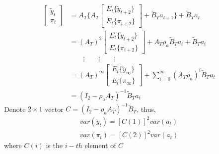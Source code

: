 \documentclass[12pt]{article}
\begin{document}
\begin{equation}
\begin{aligned}
\left[
\begin{array}{c}
 \tilde{y}_{t}\\
 \pi_{t}
\end{array}
 \right] &= A_T 
 \{
 A_T
\left[
\begin{array}{c}
E_{t}\{\tilde{y}_{t+2}\}\\
E_{t}\{ \pi_{t+2}\}
\end{array}
\right]+ \tilde{B}_{T}a_{t+1}
 \}+ \tilde{B}_{T}a_t\\
 & = (A_T)^2\left[
\begin{array}{c}
E_{t}\{\tilde{y}_{t+2}\}\\
E_{t}\{ \pi_{t+2}\}
\end{array}
\right]+A_T\rho_a\tilde{B}_{T}a_{t}+\tilde{B}_{T}a_t\\
&\qquad\vdots\qquad\vdots\qquad\vdots\\
&=(A_T)^{\infty}\left[
\begin{array}{c}
E_{t}\{\tilde{y}_{\infty}\}\\
E_{t}\{ \pi_{\infty}\}
\end{array}
\right]+\sum_{i=0}^{\infty}(A_T\rho_a)^{i}\tilde{B}_{T}a_{t}\\
& = (I_2 - \rho_a A_T)^{-1} \tilde{B}_{T}a_{t}
\end{aligned}
\end{equation}
Denote $2\times 1$ vector $ C = (I_2 - \rho_a A_T)^{-1} \tilde{B}_{T} $, thus,
\begin{gather}
  var(\tilde{y}_{t}) = [C(1)]^2 var(a_t)\\
  var(\pi_{t}) = [C(2)]^2 var(a_t)
\end{gather}
where $C(i)$ is the $i-th$ element of $C$
\end{document}
